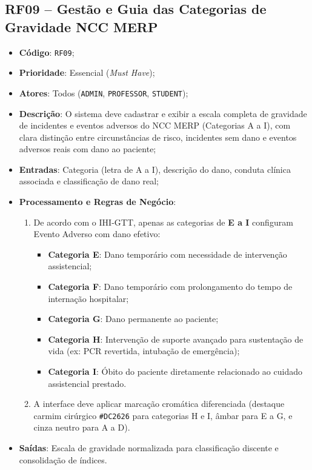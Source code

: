 \subsection{RF09 -- Gestão e Guia das Categorias de Gravidade NCC MERP}
\begin{itemize}
    \item \textbf{Código}: \texttt{RF09};
    \item \textbf{Prioridade}: Essencial (\textit{Must Have});
    \item \textbf{Atores}: Todos (\texttt{ADMIN}, \texttt{PROFESSOR}, \texttt{STUDENT});
    \item \textbf{Descrição}: O sistema deve cadastrar e exibir a escala completa de gravidade de incidentes e eventos adversos do NCC MERP (Categorias A a I), com clara distinção entre circunstâncias de risco, incidentes sem dano e eventos adversos reais com dano ao paciente;
    \item \textbf{Entradas}: Categoria (letra de A a I), descrição do dano, conduta clínica associada e classificação de dano real;
    \item \textbf{Processamento e Regras de Negócio}:
    \begin{enumerate}
        \item De acordo com o IHI-GTT, apenas as categorias de \textbf{E a I} configuram Evento Adverso com dano efetivo:
        \begin{itemize}
            \item \textbf{Categoria E}: Dano temporário com necessidade de intervenção assistencial;
            \item \textbf{Categoria F}: Dano temporário com prolongamento do tempo de internação hospitalar;
            \item \textbf{Categoria G}: Dano permanente ao paciente;
            \item \textbf{Categoria H}: Intervenção de suporte avançado para sustentação de vida (ex: PCR revertida, intubação de emergência);
            \item \textbf{Categoria I}: Óbito do paciente diretamente relacionado ao cuidado assistencial prestado.
        \end{itemize}
        \item A interface deve aplicar marcação cromática diferenciada (destaque carmim cirúrgico \texttt{\#DC2626} para categorias H e I, âmbar para E a G, e cinza neutro para A a D).
    \end{enumerate}
    \item \textbf{Saídas}: Escala de gravidade normalizada para classificação discente e consolidação de índices.
\end{itemize}

